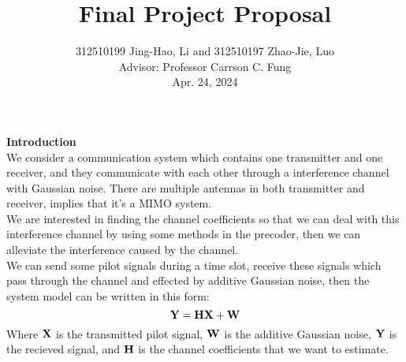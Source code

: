 \documentclass[a4paper, onecolumn, , 11pt]{IEEEtran}
\begin{document}


    \title{\huge Final Project Proposal}
    \author{312510199 Jing-Hao, Li and 312510197 Zhao-Jie, Luo\\
        Advisor: Professor Carrson C. Fung\\
        \small{Apr. 24, 2024}}


    \maketitle





    \noindent \textbf{Introduction}\\
        We consider a communication system which contains one transmitter and one receiver, and they communicate with each other through a interference channel with 
        Gaussian noise. There are multiple antennas in both transmitter and receiver, implies that it's a MIMO system.\\
        We are interested in finding the channel coefficients so that we can deal with this interference channel by using some methods in the precoder, then we
        can alleviate the interference caused by the channel. \\
        We can send some pilot signals during a time slot, receive these signals which pass through the channel and effected by additive Gaussian noise, 
        then the system model can be written in this form:
        $${\bf Y} = {\bf H}{\bf X} + {\bf W}$$
        Where ${\bf X}$ is the transmitted pilot signal, ${\bf W}$ is the additive Gaussian noise, ${\bf Y}$ is the recieved signal, and ${\bf H}$ is the channel coefficients
        that we want to estimate.\\
\end{document}
